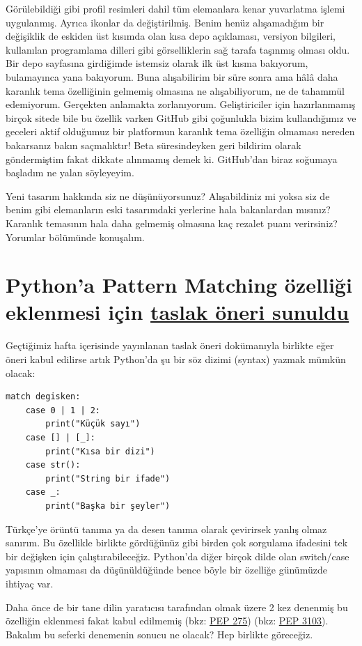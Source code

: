 \documentclass[11pt]{article}
\begin{document}
Görülebildiği gibi profil resimleri dahil tüm elemanlara kenar yuvarlatma
işlemi uygulanmış. Ayrıca ikonlar da değiştirilmiş. Benim henüz alışamadığım
bir değişiklik de eskiden üst kısımda olan kısa depo açıklaması, versiyon
bilgileri, kullanılan programlama dilleri gibi görselliklerin sağ tarafa
taşınmış olması oldu. Bir depo sayfasına girdiğimde istemsiz olarak ilk üst
kısma bakıyorum, bulamayınca yana bakıyorum. Buna alışabilirim bir süre sonra
ama hâlâ daha karanlık tema özelliğinin gelmemiş olmasına ne alışabiliyorum,
ne de tahammül edemiyorum. Gerçekten anlamakta zorlanıyorum. Geliştiriciler
için hazırlanmamış birçok sitede bile bu özellik varken GitHub gibi çoğunlukla
bizim kullandığımız ve geceleri aktif olduğumuz bir platformun karanlık tema
özelliğin olmaması nereden bakarsanız bakın saçmalıktır! Beta süresindeyken
geri bildirim olarak göndermiştim fakat dikkate alınmamış demek ki. GitHub'dan
biraz soğumaya başladım ne yalan söyleyeyim.

Yeni tasarım hakkında siz ne düşünüyorsunuz? Alışabildiniz mi yoksa siz de
benim gibi elemanların eski tasarımdaki yerlerine hala bakanlardan mısınız?
Karanlık temasının hala daha gelmemiş olmasına kaç rezalet puanı verirsiniz?
Yorumlar bölümünde konuşalım.
\section{Python'a Pattern Matching özelliği eklenmesi için \href{https://www.python.org/dev/peps/pep-0622/}{taslak öneri sunuldu}}
\label{sec:org33a919c}
Geçtiğimiz hafta içerisinde yayınlanan taslak öneri dokümanıyla birlikte eğer
öneri kabul edilirse artık Python'da şu bir söz dizimi (syntax) yazmak mümkün
olacak:

\newpage
\begin{verbatim}
match degisken:
    case 0 | 1 | 2:
        print("Küçük sayı")
    case [] | [_]:
        print("Kısa bir dizi")
    case str():
        print("String bir ifade")
    case _:
        print("Başka bir şeyler")
\end{verbatim}

Türkçe'ye örüntü tanıma ya da desen tanıma olarak çevirirsek yanlış olmaz
sanırım. Bu özellikle birlikte gördüğünüz gibi birden çok sorgulama ifadesini
tek bir değişken için çalıştırabileceğiz. Python'da diğer birçok dilde olan
switch/case yapısının olmaması da düşünüldüğünde bence böyle bir özelliğe
günümüzde ihtiyaç var.

Daha önce de bir tane dilin yaratıcısı tarafından olmak üzere 2 kez denenmiş
bu özelliğin eklenmesi fakat kabul edilmemiş (bkz: \href{https://www.python.org/dev/peps/pep-0275/}{PEP 275}) (bkz: \href{https://www.python.org/dev/peps/pep-3103/}{PEP 3103}).
Bakalım bu seferki denemenin sonucu ne olacak? Hep birlikte göreceğiz.
\end{document}
